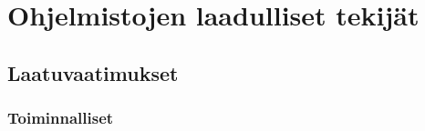 \documentclass[finnish]{tktltiki2}
\theoremstyle{definition}
\theoremstyle{remark}
\begin{document}

\section{Ohjelmistojen laadulliset tekijät}


\subsection{Laatuvaatimukset}
\subsubsection{Toiminnalliset}
\end{document}
